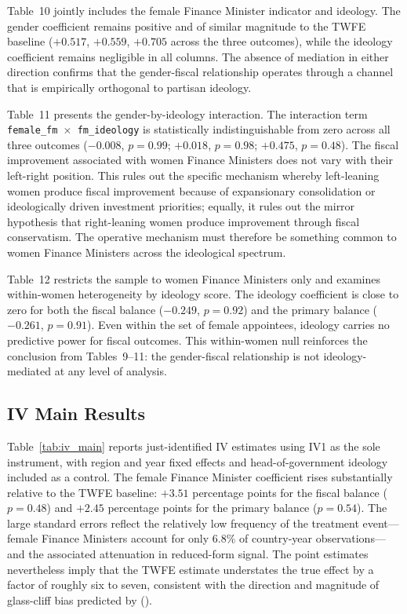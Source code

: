 \documentclass[12pt]{article}
\renewcommand{\citet}[1]{\textit{\citeauthor{#1}} (\citeyear{#1})}
\begin{document}
Table~10 jointly includes the female Finance Minister indicator and ideology. 
The gender coefficient remains positive and of similar magnitude to the TWFE 
baseline ($+0.517$, $+0.559$, $+0.705$ across the three outcomes), while the 
ideology coefficient remains negligible in all columns. The absence of 
mediation in either direction confirms that the gender-fiscal relationship 
operates through a channel that is empirically orthogonal to partisan 
ideology.


Table~11 presents the gender-by-ideology interaction. The interaction term 
\texttt{female\_fm $\times$ fm\_ideology} is statistically indistinguishable 
from zero across all three outcomes ($-0.008$, $p = 0.99$; $+0.018$, 
$p = 0.98$; $+0.475$, $p = 0.48$). The fiscal improvement associated with 
women Finance Ministers does not vary with their left-right position. This 
rules out the specific mechanism whereby left-leaning women produce fiscal 
improvement because of expansionary consolidation or ideologically driven 
investment priorities; equally, it rules out the mirror hypothesis that 
right-leaning women produce improvement through fiscal conservatism. The 
operative mechanism must therefore be something common to women Finance 
Ministers across the ideological spectrum.


Table~12 restricts the sample to women Finance Ministers only and examines 
within-women heterogeneity by ideology score. The ideology coefficient is 
close to zero for both the fiscal balance ($-0.249$, $p = 0.92$) and the 
primary balance ($-0.261$, $p = 0.91$). Even within the set of female 
appointees, ideology carries no predictive power for fiscal outcomes. This 
within-women null reinforces the conclusion from Tables~9--11: the 
gender-fiscal relationship is not ideology-mediated at any level of analysis.


\subsection{IV Main Results}

Table~\ref{tab:iv_main} reports just-identified IV estimates using IV1 as the 
sole instrument, with region and year fixed effects and head-of-government 
ideology included as a control. The female Finance Minister coefficient rises 
substantially relative to the TWFE baseline: $+3.51$ percentage points for the 
fiscal balance ($p = 0.48$) and $+2.45$ percentage points for the primary 
balance ($p = 0.54$). The large standard errors reflect the relatively low 
frequency of the treatment event---female Finance Ministers account for only 
6.8\% of country-year observations---and the associated attenuation in 
reduced-form signal. The point estimates nevertheless imply that the TWFE 
estimate understates the true effect by a factor of roughly six to seven, 
consistent with the direction and magnitude of glass-cliff bias predicted by 
\citet{armstrong2024}.
\end{document}
